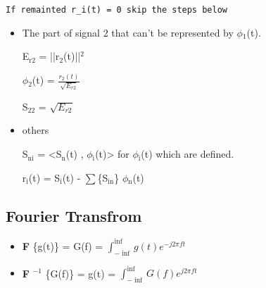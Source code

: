 \documentclass[11pt]{article}
\begin{document}
\texttt{If remainted r\_i(t) = 0 skip the steps below}

\begin{itemize}
\item The part of signal 2 that can't be represented by $\phi$$_{\text{1}}$(t).

E$_{\text{r2}}$ = ||r$_{\text{2}}$(t)||$^{\text{2}}$

$\phi$$_{\text{2}}$(t) = $\frac{r_2(t)}{\sqrt{E_{r2}}}$

S$_{\text{22}}$ = $\sqrt{E_{r2}}$
\item others

S$_{\text{ni}}$ = <S$_{\text{n}}$(t) , $\phi$$_{\text{i}}$(t)> for $\phi$$_{\text{i}}$(t) which are defined.

r$_{\text{i}}$(t) = S$_{\text{i}}$(t) - $\sum$\{S$_{\text{in}}$\} $\phi$$_{\text{n}}$(t)
\end{itemize}

\subsection{Fourier Transfrom}
\label{sec-1-4}

\begin{itemize}
\item \textbf{F} \{g(t)\} = G(f) = $\int_{-\inf}^{\inf} g(t) e^{-j2\pi ft}$

\item \textbf{F} $^{-1}$ \{G(f)\} = g(t) = $\int_{-\inf}^{\inf} G(f) e^{j2\pi ft}$
\end{itemize}
\end{document}
